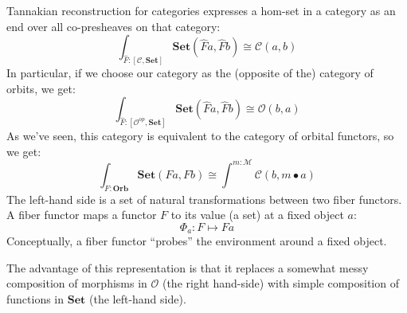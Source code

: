 \documentclass[11pt]{amsart}
\newcommand{\cat}[1]{\mathcal{#1}}%
\newcommand{\Cat}[1]{\mathbf{#1}}%
\newcommand{\Set}{\Cat{Set}}
\begin{document}
Tannakian reconstruction for categories expresses a hom-set in a category as an end over all co-presheaves on that category:
\[ \int_{\hat F \colon [\cat C, \Set]} \Set (\hat F a, \hat F b) \cong \cat C(a, b) \]
In particular, if we choose our category as the (opposite of the) category of orbits, we get:
\[ \int_{\hat F \colon [\cat O^{op}, \Set]} \Set (\hat F a, \hat F b) \cong \cat O(b, a) \]
As we've seen, this category is equivalent to the category of orbital functors, so we get:
\[ \int_{ F \colon \mathbf{Orb}} \Set (F a, F b) \cong \int^{m \colon \cat M} \cat C(b, m \bullet a) \]
The left-hand side is a set of natural transformations between two fiber functors. A fiber functor maps a functor $F$ to its value (a set) at a fixed object $a$:
\[ \Phi_a \colon F \mapsto F a \]
Conceptually, a fiber functor ``probes'' the environment around a fixed object. 

The advantage of this representation is that it replaces a somewhat messy composition of morphisms in $\cat O$ (the right hand-side) with simple composition of functions in $\Set$ (the left-hand side).
\end{document}
